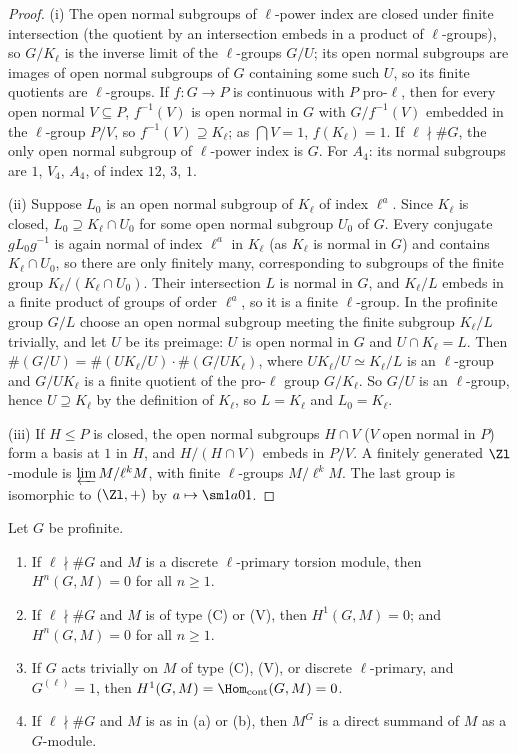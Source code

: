 \begin{proof}
(i) The open normal subgroups of $\ell$-power index are closed under finite intersection (the quotient by an intersection embeds in a product of
$\ell$-groups), so $G/K_\ell$ is the inverse limit of the $\ell$-groups $G/U$; its open normal subgroups are images of open normal subgroups of $G$ containing
some such $U$, so its finite quotients are $\ell$-groups. If $f\colon G\to P$ is continuous with $P$ pro-$\ell$, then for every open normal $V\subseteq P$,
$f^{-1}(V)$ is open normal in $G$ with $G/f^{-1}(V)$ embedded in the $\ell$-group $P/V$, so $f^{-1}(V)\supseteq K_\ell$; as $\bigcap V=1$, $f(K_\ell)=1$. If $\ell\nmid\#G$, the
only open normal subgroup of $\ell$-power index is $G$. For $A_4$: its normal subgroups are $1$, $V_4$, $A_4$, of index $12$, $3$, $1$.

(ii) Suppose $L_0$ is an open normal subgroup of $K_\ell$ of index $\ell^a$. Since $K_\ell$ is closed, $L_0\supseteq K_\ell\cap U_0$ for some open normal subgroup
$U_0$ of $G$. Every conjugate $gL_0g^{-1}$ is again normal of index $\ell^a$ in $K_\ell$ (as $K_\ell$ is normal in $G$) and contains $K_\ell\cap U_0$, so there are only
finitely many, corresponding to subgroups of the finite group $K_\ell/(K_\ell\cap U_0)$. Their intersection $L$ is normal in $G$, and $K_\ell/L$ embeds in a finite
product of groups of order $\ell^a$, so it is a finite $\ell$-group. In the profinite group $G/L$ choose an open normal subgroup meeting the finite subgroup
$K_\ell/L$ trivially, and let $U$ be its preimage: $U$ is open normal in $G$ and $U\cap K_\ell=L$. Then $\#(G/U)=\#(UK_\ell/U)\cdot\#(G/UK_\ell)$, where
$UK_\ell/U\simeq K_\ell/L$ is an $\ell$-group and $G/UK_\ell$ is a finite quotient of the pro-$\ell$ group $G/K_\ell$. So $G/U$ is an $\ell$-group, hence $U\supseteq K_\ell$ by the
definition of $K_\ell$, so $L=K_\ell$ and $L_0=K_\ell$.

(iii) If $H\le P$ is closed, the open normal subgroups $H\cap V$ ($V$ open normal in $P$) form a basis at $1$ in $H$, and $H/(H\cap V)$ embeds in $P/V$. A finitely
generated $\Zl$-module is $\varprojlim M/\ell^kM$, with finite $\ell$-groups $M/\ell^kM$. The last group is isomorphic to $(\Zl,+)$ by $a\mapsto\sm1a01$.
\end{proof}

\begin{theorem}\label{thm:cohomology:prime-to-l}
Let $G$ be profinite.
\begin{enumerate}[label=(\alph*)]
\item If $\ell\nmid\#G$ and $M$ is a discrete $\ell$-primary torsion module, then $H^n(G,M)=0$ for all $n\ge1$.
\item If $\ell\nmid\#G$ and $M$ is of type (C) or (V), then $H^1(G,M)=0$; and $H^n(G,M)=0$ for all $n\ge1$.
\item If $G$ acts trivially on $M$ of type (C), (V), or discrete $\ell$-primary, and $G^{(\ell)}=1$, then $H^1(G,M)=\Hom_{\mathrm{cont}}(G,M)=0$.
\item If $\ell\nmid\#G$ and $M$ is as in (a) or (b), then $M^G$ is a direct summand of $M$ as a $G$-module.
\end{enumerate}
\end{theorem}

